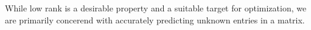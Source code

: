 \documentclass{article} %
\begin{document}








While low rank is a desirable property and a suitable target for
optimization, we are primarily concerend with accurately predicting
unknown entries in a matrix. 
\end{document}
